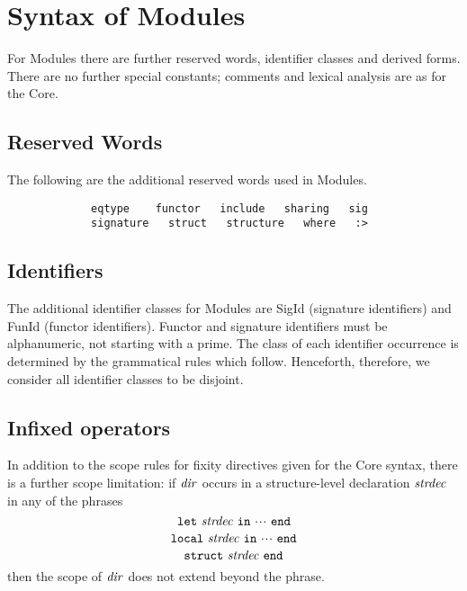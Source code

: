 %
\section{Syntax of Modules}
\label{syn-mod-sec}
For Modules there are further reserved words, identifier classes and derived
forms. There are no further special constants; 
comments and lexical analysis are as for the Core.


\subsection{Reserved Words}
The following are the additional reserved words used in Modules.
\begin{verbatim}
             eqtype    functor   include   sharing   sig
             signature   struct   structure   where   :>
\end{verbatim}
\subsection{Identifiers}
\label{syn-mod-identifiers-sec}
The additional identifier classes for Modules are SigId (signature identifiers)
and FunId (functor identifiers). Functor and signature identifiers
must be alphanumeric, not starting with a prime.  The class of each identifier occurrence
is determined by the grammatical rules which follow.  
Henceforth, therefore,
we consider all identifier classes to be disjoint.

\subsection{Infixed operators}
\label{infixopmod.sec}
In addition to the scope rules for fixity directives given for the Core syntax,
there is a further scope limitation:
if ${\it dir}$ occurs in a structure-level declaration ${\it strdec}$ in any of the 
phrases
\[ \LET\ \strdec\ \IN\ \cdots\ \END \]
\[ \LOCAL\ \strdec\ \IN\ \cdots\ \END \]
\[ \STRUCT\ \strdec\ \END \]
then the scope of ${\it dir}$ does not extend beyond the phrase.

